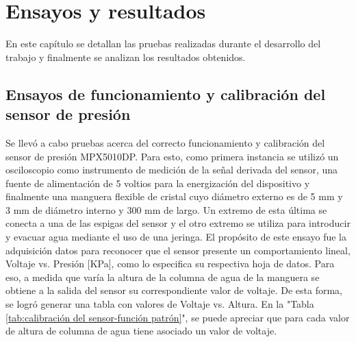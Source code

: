 
\chapter{Ensayos y resultados} %

\label{Chapter4} %

En este capítulo se detallan las pruebas realizadas durante el desarrollo del trabajo y finalmente se analizan los resultados obtenidos.
\section{Ensayos de funcionamiento y calibración del sensor de presión
}
\label{sec:Ensayos de funcionamiento y calibración del sensor de presión
}
Se llevó a cabo pruebas acerca del correcto funcionamiento y calibración del sensor de presión MPX5010DP. Para esto, como primera instancia se utilizó un osciloscopio como instrumento de medición de la señal derivada del sensor, una fuente de alimentación de 5 voltios para la energización del dispositivo y finalmente una manguera flexible de cristal cuyo diámetro externo es de 5 mm y 3 mm de diámetro interno y 300 mm de largo. Un extremo de esta última se conecta a una de las espigas del sensor y el otro extremo se utiliza para introducir y evacuar agua mediante el uso de una jeringa. El propósito de este ensayo fue la adquisición datos para reconocer que el sensor presente un comportamiento lineal, Voltaje vs. Presión [KPa], como lo especifica su respectiva hoja de datos. Para eso, a medida que varía la altura de la columna de agua de la manguera se obtiene a la salida del sensor su correspondiente valor de voltaje. De esta forma, se logró generar una tabla con valores de Voltaje vs. Altura.       
En la "Tabla \ref{tab:calibración del sensor-función patrón}", se puede apreciar que para cada valor de altura de columna de agua tiene asociado un valor de voltaje.  


